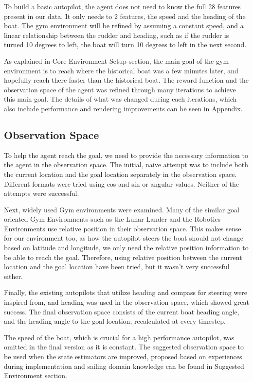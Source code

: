 \documentclass[12pt,twoside]{report}
\begin{document}
To build a basic autopilot, the agent does not need to know the full 28 features present in our data. It only needs to 2 features, the speed and the heading of the boat. The gym environment will be refined by assuming a constant speed, and a linear relationship between the rudder and heading, such as if the rudder is turned 10 degrees to left, the boat will turn 10 degrees to left in the next second.

As explained in Core Environment Setup section, the main goal of the gym environment is to reach where the historical boat was a few minutes later, and hopefully reach there faster than the historical boat. The reward function and the observation space of the agent was refined through many iterations to achieve this main goal. The details of what was changed during each iterations, which also include performance and rendering improvements can be seen in Appendix.

\subsection{Observation Space}
To help the agent reach the goal, we need to provide the necessary information to the agent in the observation space. The initial, naive attempt was to include both the current location and the goal location separately in the observation space. Different formats were tried using cos and sin or angular values. Neither of the attempts were successful.

Next, widely used Gym environments were examined. Many of the similar goal oriented Gym Environments such as the Lunar Lander \cite{LunarLander-v2} and the Robotics Environments \cite{gym-robotics} use relative position in their observation space. This makes sense for our environment too, as how the autopilot steers the boat should not change based on latitude and longitude, we only need the relative position information to be able to reach the goal. Therefore, using relative position between the current location and the goal location have been tried, but it wasn't very successful either. 

Finally, the existing autopilots that utilize heading and compass for steering were inspired from, and heading was used in the observation space, which showed great success. The final observation space consists of the current boat heading angle, and the heading angle to the goal location, recalculated at every timestep. 

The speed of the boat, which is crucial for a high performance autopilot, was omitted in the final version as it is constant. The suggested observation space to be used when the state estimators are improved, proposed based on experiences during implementation and sailing domain knowledge can be found in Suggested Environment section.
\end{document}

